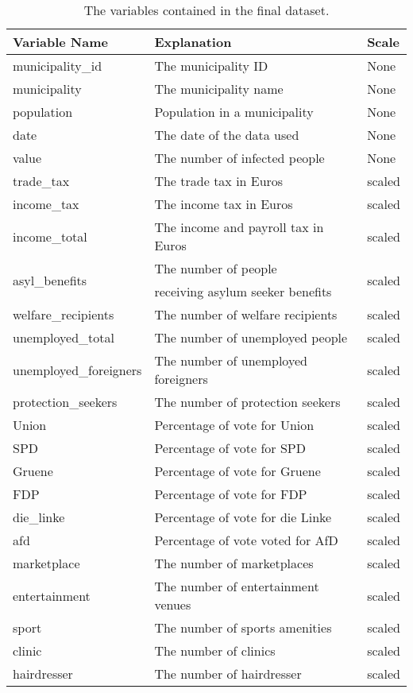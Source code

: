 \begin{table}[H] 
\caption{The variables contained in the final dataset.\label{finalGermany}}
\begin{tabular}{l l l}
\toprule
\textbf{Variable Name}	& \textbf{Explanation}	& \textbf{Scale}\\
\midrule
municipality\_id & The municipality ID & None\\
municipality & The municipality name & None \\
population & Population in a municipality & None \\
date & The date of the data used & None\\
value & The number of infected people & None \\
trade\_tax & The trade tax in Euros & scaled \\
income\_tax & The income tax in Euros & scaled \\
income\_total & The income and payroll tax in Euros & scaled \\
\multirow{2}{*}{asyl\_benefits} & The number of people & \multirow{2}{*}{scaled} \\
& receiving asylum seeker benefits \\
welfare\_recipients & The number of welfare recipients & scaled \\
unemployed\_total & The number of unemployed people & scaled \\
unemployed\_foreigners & The number of unemployed foreigners & scaled \\
protection\_seekers & The number of protection seekers & scaled \\
Union & Percentage of vote for Union & scaled\\
SPD & Percentage of vote for SPD & scaled\\
Gruene & Percentage of vote for Gruene & scaled\\
FDP & Percentage of vote for FDP & scaled\\
die\_linke & Percentage of vote for die Linke & scaled\\
afd & Percentage of vote voted for AfD & scaled \\
marketplace & The number of marketplaces & scaled \\
entertainment & The number of entertainment venues & scaled \\
sport & The number of sports amenities & scaled \\
clinic & The number of clinics & scaled \\
hairdresser & The number of hairdresser & scaled \\

\end{tabular}
\end{table}
